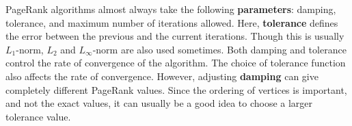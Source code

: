 




PageRank algorithms almost always take the following \textbf{parameters}: damping, tolerance, and maximum number of iterations allowed. Here, \textbf{tolerance} defines the error between the previous and the current iterations. Though this is usually $L_1$-norm, $L_2$ and $L_\infty$-norm are also used sometimes. Both damping and tolerance control the rate of convergence of the algorithm. The choice of tolerance function also affects the rate of convergence. However, adjusting \textbf{damping} can give completely different PageRank values. Since the ordering of vertices is important, and not the exact values, it can usually be a good idea to choose a larger tolerance value.

